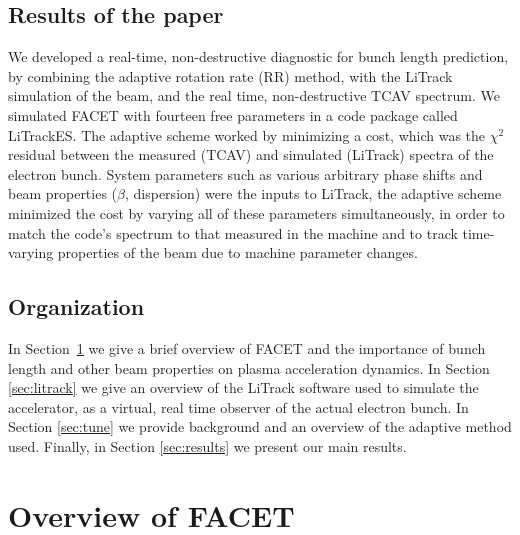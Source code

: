 \documentclass[%
twocolumn,
showpacs,preprintnumbers,
 aps,
prstab,
]{revtex4-1}
\begin{document}
\subsection{Results of the paper}

We developed a real-time, non-destructive diagnostic for bunch length prediction, by combining the adaptive rotation rate (RR) \cite{ref-stab-sch} method, with the LiTrack simulation of the beam, and the real time, non-destructive TCAV spectrum. We simulated FACET with fourteen free parameters in a code package called LiTrackES. The adaptive scheme worked by minimizing a cost, which was the $\chi^2$ residual between the measured (TCAV) and simulated (LiTrack) spectra of the electron bunch. System parameters such as various arbitrary phase shifts and beam properties ($\beta$, dispersion) were the inputs to LiTrack, the adaptive scheme minimized the cost by varying all of these parameters simultaneously, in order to match the code's spectrum to that measured in the machine and to track time-varying properties of the beam due to machine parameter changes.

\subsection{Organization} 

In Section~\ref{sec:facet} we give a brief overview of FACET and the importance of bunch length and other beam properties on plasma acceleration dynamics. In Section \ref{sec:litrack} we give an overview of the LiTrack software used to simulate the accelerator, as a virtual, real time observer of the actual electron bunch. In Section \ref{sec:tune} we provide background and an overview of the adaptive method used. Finally, in Section \ref{sec:results} we present our main results.





\section{Overview of FACET}\label{sec:facet}
\end{document}
